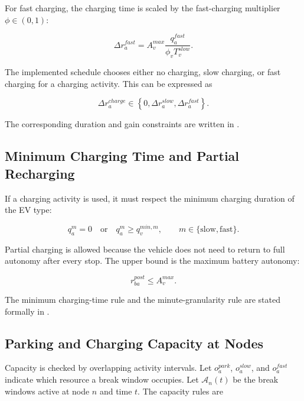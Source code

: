 For fast charging, the charging time is scaled by the fast-charging multiplier
\(\phi\in(0,1)\):

\begin{equation}
\Delta r_a^{fast}
=A^{max}_v\frac{q_a^{fast}}{\phi_v T^{slow}_v}.
\label{eq:problem-fast-charge}
\end{equation}

The implemented schedule chooses either no charging, slow charging, or fast
charging for a charging activity. This can be expressed as

\begin{equation}
\Delta r_a^{charge}
\in
\left\{0,\Delta r_a^{slow},\Delta r_a^{fast}\right\}.
\label{eq:problem-charge-choice}
\end{equation}

The corresponding duration and gain constraints are written in
.

\subsection{Minimum Charging Time and Partial Recharging}

If a charging activity is used, it must respect the minimum charging duration
of the EV type:

\begin{equation}
q_a^m=0
\quad\text{or}\quad
q_a^m\ge q^{min,m}_v,
\qquad m\in\{\mathrm{slow},\mathrm{fast}\}.
\label{eq:problem-min-charge}
\end{equation}

Partial charging is allowed because the vehicle does not need to return to full
autonomy after every stop. The upper bound is the maximum battery autonomy:

\begin{equation}
r_{ba}^{post}\le A^{max}_v.
\label{eq:problem-charge-cap}
\end{equation}

The minimum charging-time rule and the minute-granularity rule are stated
formally in .

\subsection{Parking and Charging Capacity at Nodes}

Capacity is checked by overlapping activity intervals. Let \(o_a^{park}\),
\(o_a^{slow}\), and \(o_a^{fast}\) indicate which resource a break window
occupies. Let \(\mathcal{A}_n(t)\) be the break windows active at node \(n\)
and time \(t\). The capacity rules are

